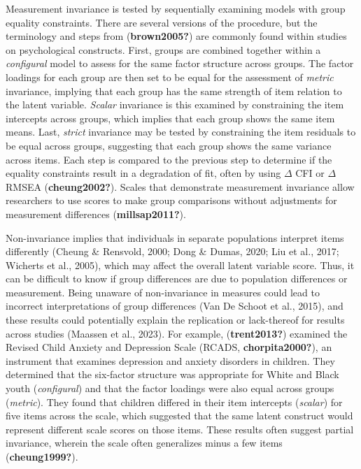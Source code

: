 \documentclass[
  man]{apa7}
\begin{document}
Measurement invariance is tested by sequentially examining models with group equality constraints. There are several versions of the procedure, but the terminology and steps from (\textbf{brown2005?}) are commonly found within studies on psychological constructs. First, groups are combined together within a \emph{configural} model to assess for the same factor structure across groups. The factor loadings for each group are then set to be equal for the assessment of \emph{metric} invariance, implying that each group has the same strength of item relation to the latent variable. \emph{Scalar} invariance is this examined by constraining the item intercepts across groups, which implies that each group shows the same item means. Last, \emph{strict} invariance may be tested by constraining the item residuals to be equal across groups, suggesting that each group shows the same variance across items. Each step is compared to the previous step to determine if the equality constraints result in a degradation of fit, often by using \(\Delta\) CFI or \(\Delta\) RMSEA (\textbf{cheung2002?}). Scales that demonstrate measurement invariance allow researchers to use scores to make group comparisons without adjustments for measurement differences (\textbf{millsap2011?}).

Non-invariance implies that individuals in separate populations interpret items differently (Cheung \& Rensvold, 2000; Dong \& Dumas, 2020; Liu et al., 2017; Wicherts et al., 2005), which may affect the overall latent variable score. Thus, it can be difficult to know if group differences are due to population differences or measurement. Being unaware of non-invariance in measures could lead to incorrect interpretations of group differences (Van De Schoot et al., 2015), and these results could potentially explain the replication or lack-thereof for results across studies (Maassen et al., 2023). For example, (\textbf{trent2013?}) examined the Revised Child Anxiety and Depression Scale (RCADS, \textbf{chorpita2000?}), an instrument that examines depression and anxiety disorders in children. They determined that the six-factor structure was appropriate for White and Black youth (\emph{configural}) and that the factor loadings were also equal across groups (\emph{metric}). They found that children differed in their item intercepts (\emph{scalar}) for five items across the scale, which suggested that the same latent construct would represent different scale scores on those items. These results often suggest partial invariance, wherein the scale often generalizes minus a few items (\textbf{cheung1999?}).
\end{document}
